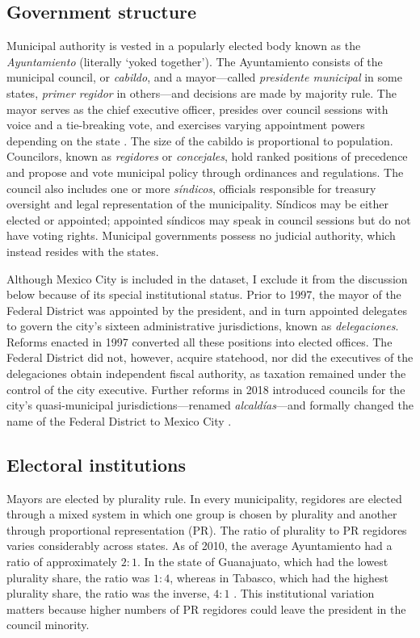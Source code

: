 \documentclass[letter,12pt]{article}
\begin{document}
\subsection{Government structure}\label{S:structure}
Municipal authority is vested in a popularly elected body known as the \emph{Ayuntamiento} (literally `yoked together'). The Ayuntamiento consists of the municipal council, or \emph{cabildo}, and a mayor---called \emph{presidente municipal} in some states, \emph{primer regidor} in others---and decisions are made by majority rule. The mayor serves as the chief executive officer, presides over council sessions with voice and a tie-breaking vote, and exercises varying appointment powers depending on the state \citep{robles-mtz.Municipio.2009, rmz-millan.2000}. The size of the cabildo is proportional to population. Councilors, known as \emph{regidores} or \emph{concejales}, hold ranked positions of precedence and propose and vote municipal policy through ordinances and regulations. The council also includes one or more \emph{síndicos}, officials responsible for treasury oversight and legal representation of the municipality. Síndicos may be either elected or appointed; appointed síndicos may speak in council sessions but do not have voting rights. Municipal governments possess no judicial authority, which instead resides with the states.

Although Mexico City is included in the dataset, I exclude it from the discussion below because of its special institutional status. Prior to 1997, the mayor of the Federal District was appointed by the president, and in turn appointed delegates to govern the city’s sixteen administrative jurisdictions, known as \emph{delegaciones}. Reforms enacted in 1997 converted all these positions into elected offices. The Federal District did not, however, acquire statehood, nor did the executives of the delegaciones obtain independent fiscal authority,  as taxation remained under the control of the city executive. Further reforms in 2018 introduced councils for the city's quasi-municipal jurisdictions---renamed \emph{alcaldías}---and formally changed the name of the Federal District to Mexico City \citep{rabell.2017}. 

\subsection{Electoral institutions}
Mayors are elected by plurality rule. In every municipality, regidores are elected through a mixed system in which one group is chosen by plurality and another through proportional representation (PR). The ratio of plurality to PR regidores varies considerably across states. As of 2010, the average Ayuntamiento had a ratio of approximately $2:1$. In the state of Guanajuato, which had the lowest plurality share, the ratio was $1:4$, whereas in Tabasco, which had the highest plurality share, the ratio was the inverse, $4:1$ \citep[][:14]{gil.2010}. This institutional variation matters because higher numbers of PR regidores could leave the president in the council minority.
\end{document}
